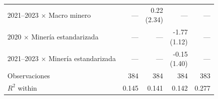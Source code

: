 \begin{tabular}{lrrrr}
2021--2023 $\times$ Macro minero & --- & \shortstack{0.22 \\ (2.34)} & --- & --- \\
2020 $\times$ Minería estandarizada & --- & --- & \shortstack{-1.77 \\ (1.12)} & --- \\
2021--2023 $\times$ Minería estandarizada & --- & --- & \shortstack{-0.15 \\ (1.40)} & --- \\
Observaciones & 384 & 384 & 384 & 383 \\
$R^2$ within & 0.145 & 0.141 & 0.142 & 0.277 \\
\bottomrule
\end{tabular}
